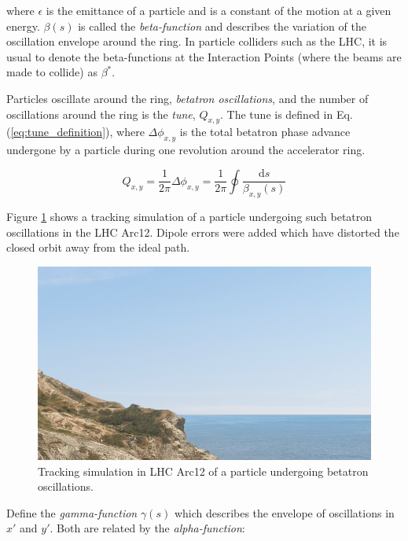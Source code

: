where $\epsilon$ is the emittance of a particle and is a constant of the motion at a given energy.
$\beta(s)$ is called the \emph{beta-function} and describes the variation of the oscillation envelope around the ring. 
In particle colliders such as the LHC, it is usual to denote the beta-functions at the Interaction Points (where the beams are made to collide) as $\beta^{*}$.
\bigbreak

Particles oscillate around the ring, \emph{betatron oscillations}, and the number of oscillations around the ring is the \emph{tune}, $Q_{x,y}$.
The tune is defined in Eq.(\ref{eq:tune_definition}), where $\Delta \phi_{x, y}$ is the total betatron phase advance undergone by a particle during one revolution around the accelerator ring.
\bigbreak

\begin{equation}
    Q_{x, y} = \frac{1}{2 \pi} \Delta \phi_{x, y} = \frac{1}{2 \pi} \oint \frac{\mathrm{d}s}{\beta_{x, y}(s)}
    \label{eq:tune_definition}
\end{equation}

Figure \ref{fig:particle_trajectories} shows a tracking simulation of a particle undergoing such betatron oscillations in the LHC Arc12.
Dipole errors were added which have distorted the closed orbit away from the ideal path.
\bigbreak

\begin{figure}[!htb]
    \begin{center}
    \includegraphics[width = 0.7\linewidth]{Figures/placeholder.png}
    \caption{Tracking simulation in LHC Arc12 of a particle undergoing betatron oscillations.}
    \label{fig:particle_trajectories}
    \end{center}
\end{figure}

Define the \emph{gamma-function} $\gamma(s)$ which describes the envelope of oscillations in $x\prime$ and $y\prime$.
Both are related by the \emph{alpha-function}:
\bigbreak

